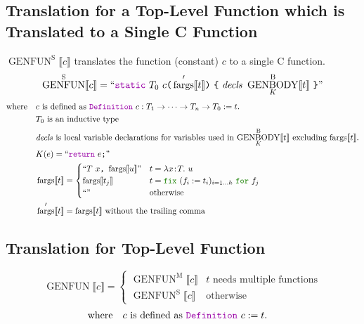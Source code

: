 \documentclass[a4paper,fleqn]{article}
\newcommand{\kwDefinition}{\mbox{\color{myviolet}\ttfamily Definition}}
\newcommand{\kwfix}{\mbox{\color{mygreen}\ttfamily fix}}
\newcommand{\kwfor}{\mbox{\color{mygreen}\ttfamily for}}
\newcommand{\lamT}[3]{\lambda #1\!:\!#2.~#3}
\newcommand{\fix}[4]{\kwfix~(#1 := #2)_{#3}~\kwfor~#4}
\newcommand{\BRA}[1]{\llbracket #1 \rrbracket}
\DeclareMathOperator{\genbody}{GENBODY}
\newcommand{\genbodyb}[2]{\genbody^\mathrm{B}_{#1}\BRA{#2}}
\DeclareMathOperator{\genfunop}{GENFUN}
\newcommand{\genfun}[1]{\genfunop\BRA{#1}}
\newcommand{\genfuns}[1]{\genfunop^\mathrm{S}\BRA{#1}}
\newcommand{\genfunm}[1]{\genfunop^\mathrm{M}\BRA{#1}}
\newcommand{\dq}[1]{\text{``}#1\text{''}}
\newcommand{\ttparen}[1]{\texttt{(}#1\texttt{)}}
\newcommand{\ttbrace}[1]{\texttt{\{}#1\texttt{\}}}
\newcommand{\ttsemi}{\texttt{;}}
\newcommand{\ttcomma}{\texttt{,}}
\newcommand{\kwCreturn}{\mbox{\color{myviolet}\ttfamily return}}
\newcommand{\kwstatic}{\mbox{\color{myviolet}\ttfamily static}}
\DeclareMathOperator{\fargsop}{fargs}
\newcommand{\fargs}[1]{\fargsop\BRA{#1}}
\newcommand{\fargsd}[1]{\fargsop'\BRA{#1}}
\begin{document}
\subsection{Translation for a Top-Level Function which is Translated to a Single C Function}\label{sec:genfuns}
\raggedright
$\genfuns{c}$ translates the function (constant) $c$ to a single C function.
\[
  \genfuns{c} = \dq{\kwstatic~T_0~c\ttparen{\fargsd{t}}~\ttbrace{~\mathit{decls}~\genbodyb{K}{t}~}}
\]
\[ \text{where} \quad
  \begin{aligned}[t]
    & \text{$c$ is defined as \kwDefinition~$c : T_1 \rightarrow \dots \rightarrow T_n \rightarrow T_0 := t.$} \\
    & \text{$T_0$ is an inductive type} \\
    & \text{$\mathit{decls}$ is local variable declarations for variables used in $\genbodyb{K}{t}$ excluding $\fargs{t}$.} \\
    & K(e) = \dq{\kwCreturn~e\ttsemi} \\
    & \fargs{t} =
      \begin{cases}
        \dq{T~x\ttcomma~\fargs{u}}      & t = \lamT{x}{T}{u} \\
        \fargs{t_j}       & t = \fix{f_i}{t_i}{i=1\dots h}{f_j} \\
        \dq{}    & \text{otherwise}
      \end{cases} \\
    & \fargsd{t} = \fargs{t}~\text{without the trailing comma}
  \end{aligned}
\]

\subsection{Translation for Top-Level Function}\label{sec:genfun}
\raggedright
\[
  \genfun{c} =
  \begin{cases}
    \genfunm{c} & \text{$t$ needs multiple functions} \\
    \genfuns{c} & \text{otherwise}
  \end{cases}
\]
\[ \text{where} \quad
  \begin{aligned}[t]
    & \text{$c$ is defined as \kwDefinition~$c := t.$}
  \end{aligned}
\]



\end{document}
